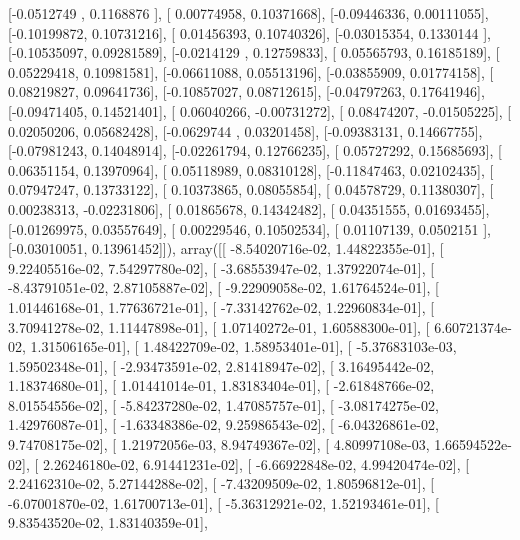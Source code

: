 \documentclass{article}
\begin{document}
       [-0.0512749 ,  0.1168876 ],
       [ 0.00774958,  0.10371668],
       [-0.09446336,  0.00111055],
       [-0.10199872,  0.10731216],
       [ 0.01456393,  0.10740326],
       [-0.03015354,  0.1330144 ],
       [-0.10535097,  0.09281589],
       [-0.0214129 ,  0.12759833],
       [ 0.05565793,  0.16185189],
       [ 0.05229418,  0.10981581],
       [-0.06611088,  0.05513196],
       [-0.03855909,  0.01774158],
       [ 0.08219827,  0.09641736],
       [-0.10857027,  0.08712615],
       [-0.04797263,  0.17641946],
       [-0.09471405,  0.14521401],
       [ 0.06040266, -0.00731272],
       [ 0.08474207, -0.01505225],
       [ 0.02050206,  0.05682428],
       [-0.0629744 ,  0.03201458],
       [-0.09383131,  0.14667755],
       [-0.07981243,  0.14048914],
       [-0.02261794,  0.12766235],
       [ 0.05727292,  0.15685693],
       [ 0.06351154,  0.13970964],
       [ 0.05118989,  0.08310128],
       [-0.11847463,  0.02102435],
       [ 0.07947247,  0.13733122],
       [ 0.10373865,  0.08055854],
       [ 0.04578729,  0.11380307],
       [ 0.00238313, -0.02231806],
       [ 0.01865678,  0.14342482],
       [ 0.04351555,  0.01693455],
       [-0.01269975,  0.03557649],
       [ 0.00229546,  0.10502534],
       [ 0.01107139,  0.0502151 ],
       [-0.03010051,  0.13961452]]), array([[ -8.54020716e-02,   1.44822355e-01],
       [  9.22405516e-02,   7.54297780e-02],
       [ -3.68553947e-02,   1.37922074e-01],
       [ -8.43791051e-02,   2.87105887e-02],
       [ -9.22909058e-02,   1.61764524e-01],
       [  1.01446168e-01,   1.77636721e-01],
       [ -7.33142762e-02,   1.22960834e-01],
       [  3.70941278e-02,   1.11447898e-01],
       [  1.07140272e-01,   1.60588300e-01],
       [  6.60721374e-02,   1.31506165e-01],
       [  1.48422709e-02,   1.58953401e-01],
       [ -5.37683103e-03,   1.59502348e-01],
       [ -2.93473591e-02,   2.81418947e-02],
       [  3.16495442e-02,   1.18374680e-01],
       [  1.01441014e-01,   1.83183404e-01],
       [ -2.61848766e-02,   8.01554556e-02],
       [ -5.84237280e-02,   1.47085757e-01],
       [ -3.08174275e-02,   1.42976087e-01],
       [ -1.63348386e-02,   9.25986543e-02],
       [ -6.04326861e-02,   9.74708175e-02],
       [  1.21972056e-03,   8.94749367e-02],
       [  4.80997108e-03,   1.66594522e-02],
       [  2.26246180e-02,   6.91441231e-02],
       [ -6.66922848e-02,   4.99420474e-02],
       [  2.24162310e-02,   5.27144288e-02],
       [ -7.43209509e-02,   1.80596812e-01],
       [ -6.07001870e-02,   1.61700713e-01],
       [ -5.36312921e-02,   1.52193461e-01],
       [  9.83543520e-02,   1.83140359e-01],
\end{document}
